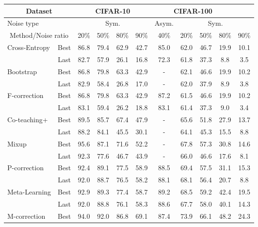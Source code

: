 \documentclass[letterpaper]{article} \usepackage{aaai22}  \usepackage{times}  \usepackage{helvet}  \usepackage{courier}  \usepackage[hyphens]{url}  \usepackage{graphicx} \usepackage{subfigure}
\begin{document}
\begin{table*}[h]
\begin{center}
\begin{tabular}{lcccccccccc}
\hline
\multicolumn{2}{c}{Dataset} & \multicolumn{4}{c}{CIFAR-10} & \multicolumn{4}{c}{CIFAR-100} \\
\hline
Noise type & & \multicolumn{4}{c}{Sym.}& Asym.  & \multicolumn{4}{c}{Sym.} \\
\hline
\multicolumn{2}{c}{Method/Noise ratio} & 20\% & 50\% & 80\% & 90\% & 40\% & 20\% & 50\% & 80\% & 90\% \\
\hline 
\multirow{2}{*}{Cross-Entropy} & Best & 86.8 & 79.4 & 62.9 & 42.7 & 85.0 & 62.0 & 46.7 & 19.9 & 10.1 \\
 & Last & 82.7 & 57.9 & 26.1 & 16.8 & 72.3 & 61.8 & 37.3 & 8.8 & 3.5 \\
\multirow{2}{*}{Bootstrap \cite{reed2014training}} & Best & 86.8 & 79.8 & 63.3 & 42.9 & - & 62.1 & 46.6 & 19.9 & 10.2 \\
 & Last & 82.9 & 58.4 & 26.8 & 17.0 & - & 62.0 & 37.9 & 8.9 & 3.8 \\
\multirow{2}{*}{F-correction \cite{patrini2017making}} & Best & 86.8 & 79.8 & 63.3 & 42.9 & 87.2 & 61.5 & 46.6 & 19.9 & 10.2 \\
 & Last & 83.1 & 59.4 & 26.2 & 18.8 & 83.1 & 61.4 & 37.3 & 9.0 & 3.4 \\
\multirow{2}{*}{Co-teaching+ \cite{yu2019does}} & Best & 89.5 & 85.7 & 67.4 & 47.9 & - & 65.6 & 51.8 & 27.9 & 13.7 \\
 & Last & 88.2 & 84.1 & 45.5 & 30.1 & - & 64.1 & 45.3 & 15.5 & 8.8 \\
\multirow{2}{*}{Mixup \cite{zhang2017mixup}} & Best & 95.6 & 87.1 & 71.6 & 52.2 & - & 67.8 & 57.3 & 30.8 & 14.6 \\
 & Last & 92.3 & 77.6 & 46.7 & 43.9 & - & 66.0 & 46.6 & 17.6 & 8.1 \\
\multirow{2}{*}{P-correction \cite{yi2019probabilistic}} & Best & 92.4 & 89.1 & 77.5 & 58.9 & 88.5 & 69.4 & 57.5 & 31.1 & 15.3 \\
 & Last & 92.0 & 88.7 & 76.5 & 58.2 & 88.1 & 68.1 & 56.4 & 20.7 & 8.8 \\
\multirow{2}{*}{Meta-Learning \cite{li2019learning}} & Best & 92.9 & 89.3 & 77.4 & 58.7 & 89.2 & 68.5 & 59.2 & 42.4 & 19.5 \\
 & Last & 92.0 & 88.8 & 76.1 & 58.3 & 88.6 & 67.7 & 58.0 & 40.1 & 14.3 \\
\multirow{2}{*}{M-correction \cite{arazo2019unsupervised}} & Best & 94.0 & 92.0 & 86.8 & 69.1 & 87.4 & 73.9 & 66.1 & 48.2 & 24.3 \\

\end{tabular}
\end{center}
\end{table*}
\end{document}
